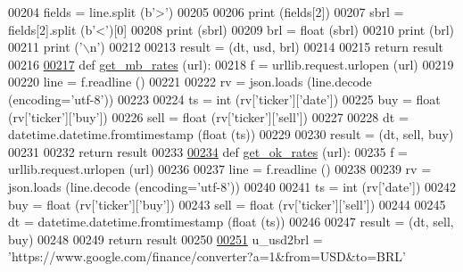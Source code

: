 \begin{DoxyCode}
00204             fields = line.split (b\textcolor{stringliteral}{'>'})
00205             
00206             \textcolor{keywordflow}{print} (fields[2])
00207             sbrl = fields[2].split (b\textcolor{stringliteral}{'<'})[0]
00208             \textcolor{keywordflow}{print} (sbrl)
00209             brl = float (sbrl)
00210             \textcolor{keywordflow}{print} (brl)
00211             \textcolor{keywordflow}{print} (\textcolor{stringliteral}{'\(\backslash\)n'})
00212             
00213     result = (dt, usd, brl)
00214     
00215     \textcolor{keywordflow}{return} result
00216 
\hypertarget{raw__urlparser_8py_source.tex_l00217}{}\hyperlink{namespaceraw__urlparser_ae2341143e866401a993a5a964610f7a6}{00217} \textcolor{keyword}{def }\hyperlink{namespaceraw__urlparser_ae2341143e866401a993a5a964610f7a6}{get\_mb\_rates} (url):
00218     f = urllib.request.urlopen (url)
00219     
00220     line = f.readline ()
00221     
00222     rv = json.loads (line.decode (encoding=\textcolor{stringliteral}{'utf-8'}))
00223     
00224     ts   = int   (rv[\textcolor{stringliteral}{'ticker'}][\textcolor{stringliteral}{'date'}])
00225     buy  = float (rv[\textcolor{stringliteral}{'ticker'}][\textcolor{stringliteral}{'buy'}])
00226     sell = float (rv[\textcolor{stringliteral}{'ticker'}][\textcolor{stringliteral}{'sell'}])
00227     
00228     dt = datetime.datetime.fromtimestamp (float (ts))
00229     
00230     result = (dt, sell, buy)
00231     
00232     \textcolor{keywordflow}{return} result
00233 
\hypertarget{raw__urlparser_8py_source.tex_l00234}{}\hyperlink{namespaceraw__urlparser_aaf342c097e3df48d46b7296e8177d737}{00234} \textcolor{keyword}{def }\hyperlink{namespaceraw__urlparser_aaf342c097e3df48d46b7296e8177d737}{get\_ok\_rates} (url):
00235     f = urllib.request.urlopen (url)
00236     
00237     line = f.readline ()
00238     
00239     rv = json.loads (line.decode (encoding=\textcolor{stringliteral}{'utf-8'}))
00240     
00241     ts   = int   (rv[\textcolor{stringliteral}{'date'}])
00242     buy  = float (rv[\textcolor{stringliteral}{'ticker'}][\textcolor{stringliteral}{'buy'}])
00243     sell = float (rv[\textcolor{stringliteral}{'ticker'}][\textcolor{stringliteral}{'sell'}])
00244     
00245     dt = datetime.datetime.fromtimestamp (float (ts))
00246     
00247     result = (dt, sell, buy)
00248     
00249     \textcolor{keywordflow}{return} result
00250     
\hypertarget{raw__urlparser_8py_source.tex_l00251}{}\hyperlink{namespaceraw__urlparser_a63e1f0abe7b1f43c4891ce9aec98261d}{00251} u\_usd2brl = \textcolor{stringliteral}{'https://www.google.com/finance/converter?a=1&from=USD&to=BRL'}

\end{DoxyCode}
